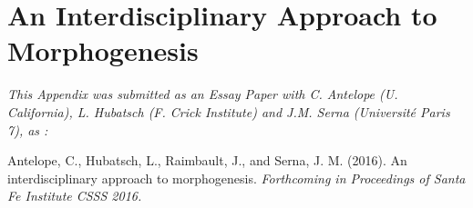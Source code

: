 
\chapter{An Interdisciplinary Approach to Morphogenesis} %

\label{app:syntheticdata} %


\textit{This Appendix was submitted as an Essay Paper with C. Antelope (U. California), L. Hubatsch (F. Crick Institute) and J.M. Serna (Université Paris 7), as : }

\noindent Antelope, C., Hubatsch, L., Raimbault, J., and Serna, J. M. (2016). An interdisciplinary approach to morphogenesis. \textit{Forthcoming in Proceedings of Santa Fe Institute CSSS 2016.}







